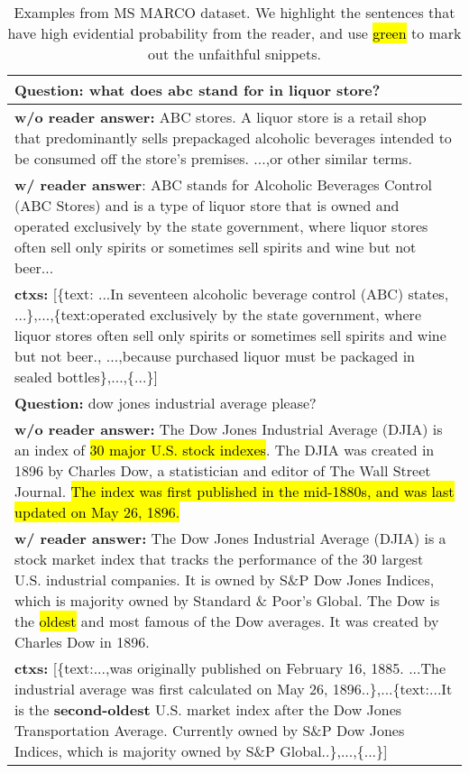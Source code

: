 \documentclass[11pt]{article}
\DeclareRobustCommand{\hlgreen}[1]{{\sethlcolor{soulgreen}\hl{#1}}}
\begin{document}
\begin{table}[!ht]
\vspace{-5pt}
\small
\begin{adjustbox}{width={0.49\textwidth},totalheight={\textheight},keepaspectratio}
\begin{tabular}{p{}}
\hline
\textbf{Question:} what does abc stand for in liquor store?  \\
\hline
\textbf{w/o reader answer:} ABC stores. A liquor store is a retail shop that predominantly sells prepackaged alcoholic beverages intended to be consumed off the store's premises. ...,or other similar terms. \\
\textbf{w/ reader answer}: ABC stands for Alcoholic Beverages Control (ABC Stores) and is a type of liquor store that is owned and operated exclusively by the state government, where liquor stores often sell only spirits or sometimes sell spirits and wine but not beer...\\
\textbf{ctxs:} [\{text: ...\textcolor[RGB]{5, 30, 255}{In seventeen alcoholic beverage control (ABC) states}, ...\},...,\{text:\textcolor[RGB]{5, 30, 255}{operated exclusively by the state government, where liquor stores often sell only spirits or sometimes sell spirits and wine but not beer.}, ...,because purchased liquor must be packaged in sealed bottles\},...,\{...\}]\\
\hline
\textbf{Question:} dow jones industrial average please? \\
\hline
\textbf{w/o reader answer:} The Dow Jones Industrial Average (DJIA) is an index of \hlgreen{30 major U.S. stock indexes}. The DJIA was created in 1896 by Charles Dow, a statistician and editor of The Wall Street Journal. \hlgreen{The index was first published in the mid-1880s, and was last updated on May 26, 1896.} \\
\textbf{w/ reader answer:} The Dow Jones Industrial Average (DJIA) is a stock market index that tracks the performance of the 30 largest U.S. industrial companies. It is owned by S\&P Dow Jones Indices, which is majority owned by Standard \& Poor's Global. The Dow is the \hlgreen{oldest} and most famous of the Dow averages. It was created by Charles Dow in 1896. \\
 \textbf{ctxs:} [\{text:...,was originally published on February 16, 1885. ...\textcolor[RGB]{5, 30, 255}{The industrial average was first calculated on May 26, 1896}..\},...\{text:...It is the \textbf{second-oldest} U.S. market index after the Dow Jones Transportation Average. \textcolor[RGB]{5, 30, 255}{Currently owned by S\&P Dow Jones Indices, which is majority owned by S\&P Global}..\},...,\{...\}]
 \\
 \hline
\end{tabular}
 \end{adjustbox}
\caption{Examples from MS MARCO dataset. We \textcolor[RGB]{5, 30, 255}{highlight} the sentences that have high evidential probability from the reader, and use \hlgreen{green} to mark out the unfaithful snippets. }
\label{tab:reader_examples}
\vspace{-15pt}
\end{table}
\end{document}
